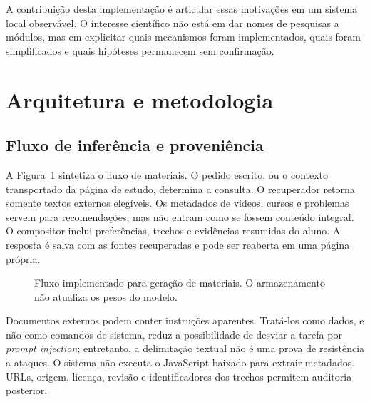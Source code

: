 \documentclass[12pt]{article}
\begin{document}
A contribuição desta implementação é articular essas motivações em um sistema local observável. O interesse científico não está em dar nomes de pesquisas a módulos, mas em explicitar quais mecanismos foram implementados, quais foram simplificados e quais hipóteses permanecem sem confirmação.

\section{Arquitetura e metodologia}
\subsection{Fluxo de inferência e proveniência}
A Figura~\ref{fig:arquitetura} sintetiza o fluxo de materiais. O pedido escrito, ou o contexto transportado da página de estudo, determina a consulta. O recuperador retorna somente textos externos elegíveis. Os metadados de vídeos, cursos e problemas servem para recomendações, mas não entram como se fossem conteúdo integral. O compositor inclui preferências, trechos e evidências resumidas do aluno. A resposta é salva com as fontes recuperadas e pode ser reaberta em uma página própria.

\begin{figure}[ht]
\centering
{}
\caption{Fluxo implementado para geração de materiais. O armazenamento não atualiza os pesos do modelo.}
\label{fig:arquitetura}
\end{figure}

Documentos externos podem conter instruções aparentes. Tratá-los como dados, e não como comandos de sistema, reduz a possibilidade de desviar a tarefa por \emph{prompt injection}; entretanto, a delimitação textual não é uma prova de resistência a ataques. O sistema não executa o JavaScript baixado para extrair metadados. URLs, origem, licença, revisão e identificadores dos trechos permitem auditoria posterior.
\end{document}
